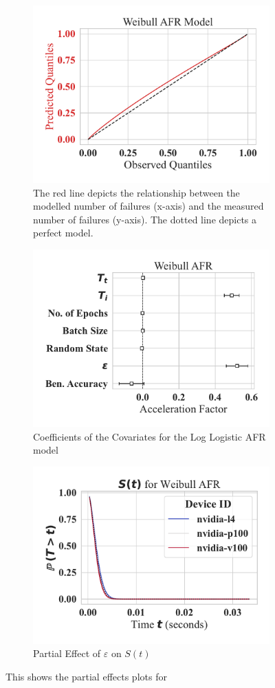 \documentclass[conference]{IEEEtran}
\begin{document}
\begin{figure}[h!]
    \centering
    \begin{subfigure}[b]{\linewidth}
        \centering
        \includegraphics[width=.6\linewidth,clip]{plots/combined/weibull_qq.pdf}
        \caption{The red line depicts the relationship between the modelled number of failures (x-axis) and the measured number of failures (y-axis). The dotted line depicts a perfect model.}
        \label{fig:qq}
    \end{subfigure}
    \begin{subfigure}[b]{\linewidth}
        \centering
        \includegraphics[width=.7\linewidth,clip]{plots/combined/weibull_aft.pdf}
        \caption{Coefficients of the Covariates for the Log Logistic AFR model}
        \label{fig:aft}
    \end{subfigure}
    \begin{subfigure}[b]{\linewidth}
        \centering
        \includegraphics[width=.7\linewidth,clip]{plots/combined/weibull_device_num_partial_effect.pdf}
        \caption{Partial Effect  of $\varepsilon$ on $S(t)$ }
        \label{fig:partial}
    \end{subfigure}
    \caption{This shows the partial effects plots for}
\end{figure}
\end{document}
